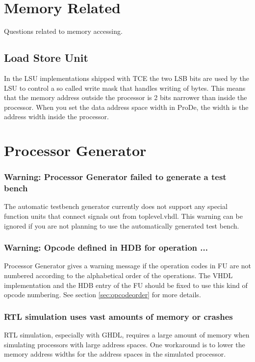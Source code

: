 \documentclass[a4paper,twoside]{tceusermanual}
\begin{document}
\section{Memory Related}

Questions related to memory accessing.

\subsection{Load Store Unit}

In the LSU implementations shipped with TCE the two LSB bits are used by the LSU to control
a so called write mask that handles writing of bytes. This means that the
memory address outside the processor is 2 bits narrower than inside the
processor. When you set the data address space width in ProDe, the width
is the address width inside the processor.


\section{Processor Generator}

\subsubsection{Warning: Processor Generator failed to generate a test bench}
The automatic testbench generator currently does not support any special
function units that connect signals out from toplevel.vhdl. This warning
can be ignored if you are not planning to use the automatically generated
test bench.

\subsubsection{Warning: Opcode defined in HDB for operation ...}

Processor Generator gives a warning message if the operation codes in FU
are not numbered according to the alphabetical order of the operations.
The VHDL implementation and the HDB entry of the FU should be fixed to use 
this kind of opcode numbering. See section \ref{sec:opcodeorder} for more 
details.

\subsubsection{RTL simulation uses vast amounts of memory or crashes}

RTL simulation, especially with GHDL, requires a large amount of memory when
simulating processors with large address spaces. One workaround is to lower
the memory address widths for the address spaces in the simulated processor.
\end{document}
